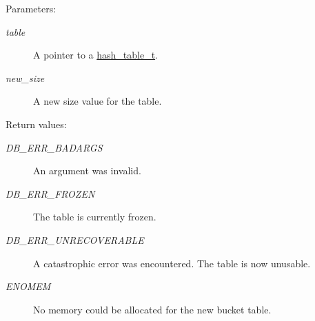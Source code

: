 \begin{Desc}
\item[Parameters:]
\begin{description}
\item[{\em table}]A pointer to a \hyperlink{group__dbprim__hash_a0}{hash\_\-table\_\-t}. \item[{\em new\_\-size}]A new size value for the table.\end{description}
\end{Desc}
\begin{Desc}
\item[Return values:]
\begin{description}
\item[{\em DB\_\-ERR\_\-BADARGS}]An argument was invalid. \item[{\em DB\_\-ERR\_\-FROZEN}]The table is currently frozen. \item[{\em DB\_\-ERR\_\-UNRECOVERABLE}]A catastrophic error was encountered. The table is now unusable. \item[{\em ENOMEM}]No memory could be allocated for the new bucket table. \end{description}
\end{Desc}
